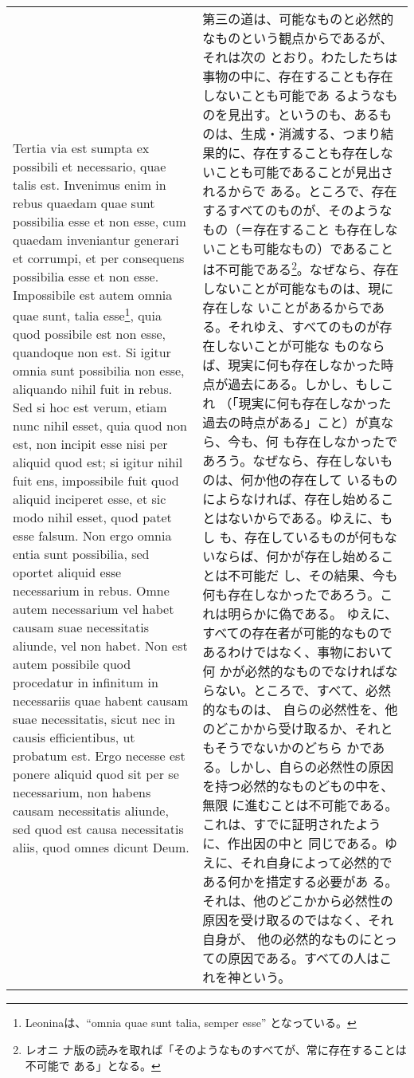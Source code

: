 \documentclass[10pt]{jsarticle}
\begin{document}
\begin{longtable}{p{21em}p{21em}}
\\

Tertia via est sumpta ex possibili et necessario, quae talis
est. Invenimus enim in rebus quaedam quae sunt possibilia esse et non
esse, cum quaedam inveniantur generari et corrumpi, et per consequens
possibilia esse et non esse. Impossibile est autem omnia quae sunt,
talia esse\footnote{Leoninaは、``omnia quae sunt talia, semper esse''
となっている。}, quia quod possibile est non esse, quandoque non
est. Si igitur omnia sunt possibilia non esse, aliquando nihil fuit in
rebus. Sed si hoc est verum, etiam nunc nihil esset, quia quod non
est, non incipit esse nisi per aliquid quod est; si igitur nihil fuit
ens, impossibile fuit quod aliquid inciperet esse, et sic modo nihil
esset, quod patet esse falsum. Non ergo omnia entia sunt possibilia,
sed oportet aliquid esse necessarium in rebus. Omne autem necessarium
vel habet causam suae necessitatis aliunde, vel non habet. Non est
autem possibile quod procedatur in infinitum in necessariis quae
habent causam suae necessitatis, sicut nec in causis efficientibus, ut
probatum est. Ergo necesse est ponere aliquid quod sit per se
necessarium, non habens causam necessitatis aliunde, sed quod est
causa necessitatis aliis, quod omnes dicunt Deum.

& 

第三の道は、可能なものと必然的なものという観点からであるが、それは次の
とおり。わたしたちは事物の中に、存在することも存在しないことも可能であ
るようなものを見出す。というのも、あるものは、生成・消滅する、つまり結
果的に、存在することも存在しないことも可能であることが見出されるからで
ある。ところで、存在するすべてのものが、そのようなもの（＝存在すること
も存在しないことも可能なもの）であることは不可能である\footnote{レオニ
ナ版の読みを取れば「そのようなものすべてが、常に存在することは不可能で
ある」となる。}。なぜなら、存在しないことが可能なものは、現に存在しな
いことがあるからである。それゆえ、すべてのものが存在しないことが可能な
ものならば、現実に何も存在しなかった時点が過去にある。しかし、もしこれ
（「現実に何も存在しなかった過去の時点がある」こと）が真なら、今も、何
も存在しなかったであろう。なぜなら、存在しないものは、何か他の存在して
いるものによらなければ、存在し始めることはないからである。ゆえに、もし
も、存在しているものが何もないならば、何かが存在し始めることは不可能だ
し、その結果、今も何も存在しなかったであろう。これは明らかに偽である。
ゆえに、すべての存在者が可能的なものであるわけではなく、事物において何
かが必然的なものでなければならない。ところで、すべて、必然的なものは、
自らの必然性を、他のどこかから受け取るか、それともそうでないかのどちら
かである。しかし、自らの必然性の原因を持つ必然的なものどもの中を、無限
に進むことは不可能である。これは、すでに証明されたように、作出因の中と
同じである。ゆえに、それ自身によって必然的である何かを措定する必要があ
る。それは、他のどこかから必然性の原因を受け取るのではなく、それ自身が、
他の必然的なものにとっての原因である。すべての人はこれを神という。


\end{longtable}
\end{document}
